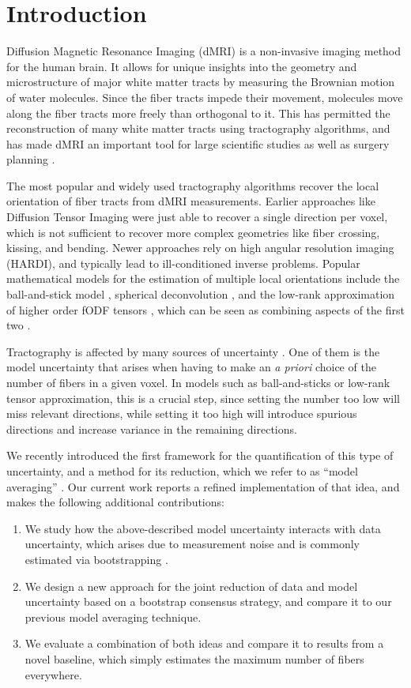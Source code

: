 \section{Introduction}
Diffusion Magnetic Resonance Imaging (dMRI) \cite{LeBihan:1986} is a
non-invasive imaging method for the human brain. It allows for
unique insights into the geometry and microstructure of major white matter tracts by measuring the Brownian motion of water molecules. Since
the fiber tracts impede their movement, molecules move along the fiber tracts
more freely than orthogonal to it. This has permitted the reconstruction of many white matter tracts using tractography algorithms, and has made dMRI an important tool for large
scientific studies \cite{Sotiropoulos:2013, Tobisch:2018Frontiers} as well as surgery planning \cite{Yang:2021}.

The most popular and widely used tractography algorithms recover the local
orientation of fiber tracts from dMRI measurements. Earlier approaches like
Diffusion Tensor Imaging \cite{BASSER1994247}
were just able to recover a single direction per voxel, which is not sufficient
to recover more complex geometries like fiber crossing, kissing, and bending.
Newer approaches rely on high angular resolution imaging (HARDI), and typically lead to ill-conditioned inverse problems. Popular mathematical models for the estimation of multiple local orientations include the
ball-and-stick model \cite{BEHRENS2007144}, spherical deconvolution \cite{TOURNIER20071459}, and the low-rank approximation of higher order fODF tensors
\cite{lowrank}, which can be seen as combining aspects of the first two \cite{Schultz:MICCAI10}.

Tractography is affected by many sources of uncertainty \cite{Schultz:SciVisBook2014}. One of them is the model uncertainty that arises when having to make an \emph{a priori} choice of the number of fibers in a given voxel. In models such as ball-and-sticks or low-rank tensor approximation, this is a
crucial step, since setting the number too low will miss relevant directions, while setting it too high will introduce spurious directions and increase variance in the remaining directions.

We recently introduced the first framework for the quantification of this type of uncertainty, and a method for its reduction, which we refer to as ``model averaging'' \cite{Gruen:2021}. Our current work reports a refined implementation of that idea, and makes the following additional contributions:
\begin{enumerate}
\item We study how the above-described model uncertainty interacts with data uncertainty, which arises due to measurement noise and is commonly estimated via bootstrapping \cite{Jones:2008}.
\item We design a new approach for the joint reduction of data and model uncertainty based on a bootstrap consensus strategy, and compare it to our previous model averaging technique.
\item We evaluate a combination of both ideas and compare it to results from a novel baseline, which simply estimates the maximum number of fibers everywhere.
\end{enumerate}

